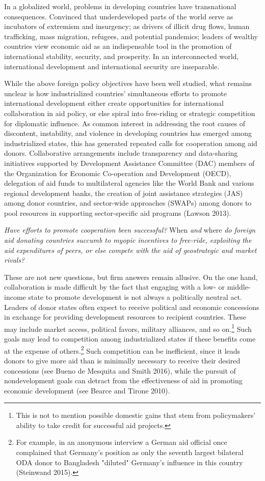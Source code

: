 \documentclass[12pt,]{article}
\begin{document}
In a globalized world, problems in developing countries have
transnational consequences. Convinced that underdeveloped parts of the
world serve as incubators of extremism and insurgency; as drivers of
illicit drug flows, human trafficking, mass migration, refugees, and
potential pandemics; leaders of wealthy countries view economic aid as
an indispensable tool in the promotion of international stability,
security, and prosperity. In an interconnected world, international
development and international security are inseparable.

While the above foreign policy objectives have been well studied, what
remains unclear is how industrialized countries' simultaneous efforts to
promote international development either create opportunities for
international collaboration in aid policy, or else spiral into
free-riding or strategic competition for diplomatic influence. As common
interest in addressing the root causes of discontent, instability, and
violence in developing countries has emerged among industrialized
states, this has generated repeated calls for cooperation among aid
donors. Collaborative arrangements include transparency and data-sharing
initiatives supported by Development Assistance Committee (DAC) members
of the Organization for Economic Co-operation and Development (OECD),
delegation of aid funds to multilateral agencies like the World Bank and
various regional development banks, the creation of joint assistance
strategies (JAS) among donor countries, and sector-wide approaches
(SWAPs) among donors to pool resources in supporting sector-specific aid
programs (Lawson 2013).

\emph{Have efforts to promote cooperation been successful?} When
\emph{and} where \emph{do foreign aid donating countries succumb to
myopic incentives to free-ride, exploiting the aid expenditures of
peers, or else compete with the aid of geostrategic and market rivals?}

These are not new questions, but firm answers remain allusive. On the
one hand, collaboration is made difficult by the fact that engaging with
a low- or middle-income state to promote development is not always a
politically neutral act. Leaders of donor states often expect to receive
political and economic concessions in exchange for providing development
resources to recipient countries. These may include market access,
political favors, military alliances, and so
on.\footnote{This is not to mention possible domestic gains that stem from policymakers' ability to take credit for successful aid projects.}
Such goals may lead to competition among industrialized states if these
benefits come at the expense of
others.\footnote{For example, in an anonymous interview a German aid official once complained that Germany's position as only the seventh largest bilateral ODA donor to Bangladesh "diluted" Germany's influence in this country (Steinwand 2015).}
Such competition can be inefficient, since it leads donors to give more
aid than is minimally necessary to receive their desired concessions
(see Bueno de Mesquita and Smith 2016), while the pursuit of
nondevelopment goals can detract from the effectiveness of aid in
promoting economic development (see Bearce and Tirone 2010).
\end{document}
